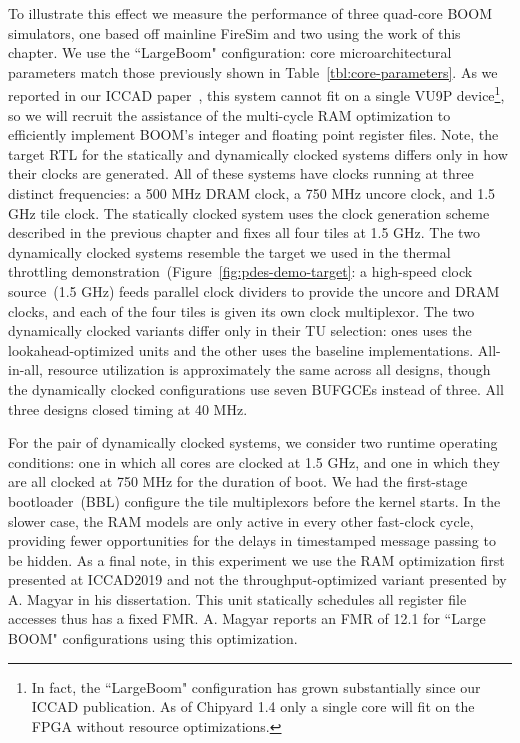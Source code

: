 To illustrate this effect we measure the performance of three quad-core BOOM
simulators, one based off mainline FireSim and two using the work of this
chapter. We use the ``LargeBoom" configuration: core microarchitectural parameters match those previously shown in Table~\ref{tbl:core-parameters}.
As we reported in our ICCAD paper~\cite{GoldenGate}, this system
cannot fit on a single VU9P device\footnote{In fact, the ``LargeBoom"
configuration has grown substantially since our ICCAD publication. As of
Chipyard 1.4 only a single core will fit on the FPGA without resource
optimizations.}, so we will recruit the assistance
of the multi-cycle RAM optimization to efficiently implement BOOM's integer and floating point register files.  Note, the target RTL for the statically
and dynamically clocked systems differs only in how their clocks are generated.
All of these systems have clocks running at three distinct frequencies: a 500
MHz DRAM clock, a 750 MHz uncore clock, and
1.5 GHz tile clock. The statically clocked system uses the clock generation scheme
described in the previous chapter and fixes all four tiles at 1.5 GHz. The two
dynamically clocked systems resemble the target we used in the thermal
throttling demonstration~(Figure~\ref{fig:pdes-demo-target}:
a high-speed clock source~(1.5 GHz) feeds
parallel clock dividers to provide the uncore and DRAM clocks, and each of the
four tiles is given its own clock multiplexor. The two dynamically clocked variants differ only in
their TU selection: ones uses the lookahead-optimized units and the other uses
the baseline implementations.  All-in-all, resource utilization is
approximately the same across all designs, though the dynamically clocked
configurations use seven BUFGCEs instead of three.  All three designs closed
timing at 40 MHz.

For the pair of dynamically clocked systems, we consider two runtime operating conditions:
one in which all cores are clocked at 1.5 GHz, and one in which they are all
clocked at 750 MHz for the duration of boot. We had the first-stage
bootloader~(BBL) configure the tile multiplexors before the kernel starts. In the slower case, the RAM models are only active in every
other fast-clock cycle, providing fewer opportunities for the delays in
timestamped message passing to be hidden. As a final note, in this experiment we use the
RAM optimization first presented at ICCAD2019 and not the throughput-optimized
variant presented by A. Magyar in his dissertation. This unit statically
schedules all register file accesses thus has a fixed FMR.  A. Magyar reports an
FMR of 12.1 for ``Large BOOM" configurations using this optimization.


